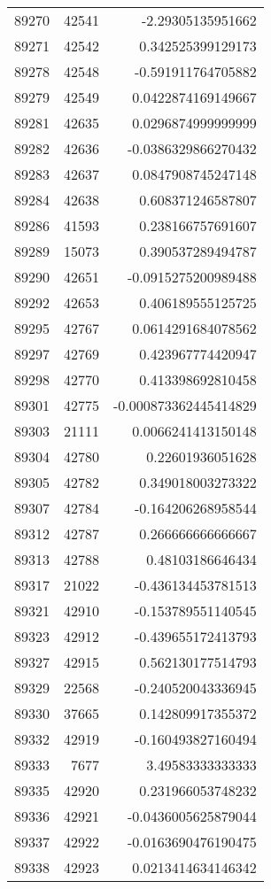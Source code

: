\begin{tabular}{r | r | r}
89270 & 42541 & -2.29305135951662 \\
89271 & 42542 & 0.342525399129173 \\
89278 & 42548 & -0.591911764705882 \\
89279 & 42549 & 0.0422874169149667 \\
89281 & 42635 & 0.0296874999999999 \\
89282 & 42636 & -0.0386329866270432 \\
89283 & 42637 & 0.0847908745247148 \\
89284 & 42638 & 0.608371246587807 \\
89286 & 41593 & 0.238166757691607 \\
89289 & 15073 & 0.390537289494787 \\
89290 & 42651 & -0.0915275200989488 \\
89292 & 42653 & 0.406189555125725 \\
89295 & 42767 & 0.0614291684078562 \\
89297 & 42769 & 0.423967774420947 \\
89298 & 42770 & 0.413398692810458 \\
89301 & 42775 & -0.000873362445414829 \\
89303 & 21111 & 0.0066241413150148 \\
89304 & 42780 & 0.22601936051628 \\
89305 & 42782 & 0.349018003273322 \\
89307 & 42784 & -0.164206268958544 \\
89312 & 42787 & 0.266666666666667 \\
89313 & 42788 & 0.48103186646434 \\
89317 & 21022 & -0.436134453781513 \\
89321 & 42910 & -0.153789551140545 \\
89323 & 42912 & -0.439655172413793 \\
89327 & 42915 & 0.562130177514793 \\
89329 & 22568 & -0.240520043336945 \\
89330 & 37665 & 0.142809917355372 \\
89332 & 42919 & -0.160493827160494 \\
89333 & 7677 & 3.49583333333333 \\
89335 & 42920 & 0.231966053748232 \\
89336 & 42921 & -0.0436005625879044 \\
89337 & 42922 & -0.0163690476190475 \\
89338 & 42923 & 0.0213414634146342 \\

\end{tabular}
